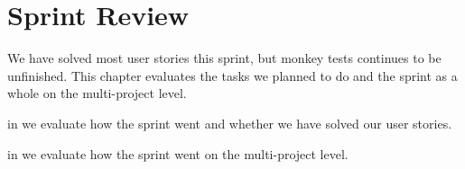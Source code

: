 \chapter{Sprint Review}\label{chap:sprint2_end}
We have solved most user stories this sprint, but monkey tests continues to be unfinished. This chapter evaluates the tasks we planned to do and the sprint as a whole on the multi-project level.

\begin{chapterorganization}
  \item in  we evaluate how the sprint went and whether we have solved our user stories.
  \item in  we evaluate how the sprint went on the multi-project level.
\end{chapterorganization}

